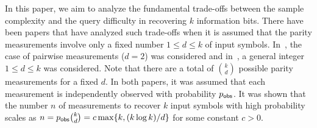 \documentclass[11pt,onecolumn]{IEEEtran}
\begin{document}

In this paper, we aim to analyze the fundamental trade-offs between the sample complexity and the query difficulty in recovering $k$ information bits.
There have been papers that have analyzed such trade-offs when it is assumed that the parity measurements involve only a fixed number $1\leq d\leq k$ of input symbols. 
In~\cite{chen2016information}, the case of pairwise measurements ($d=2$) was considered and in~\cite{ahn2016community}, a general integer $1\leq d\leq k$ was considered. 
Note that there are a total of $k\choose d$ possible parity measurements for a fixed $d$. In both papers, it was assumed that each measurement is independently observed with probability $p_{\sf obs}$.
It was shown that the number $n$ of measurements to recover $k$ input symbols with high probability scales as $n=p_{\sf obs}{k\choose d}=c\max\{k,({k\log k})/{d}\}$ for some constant $c>0$. 
\end{document}
